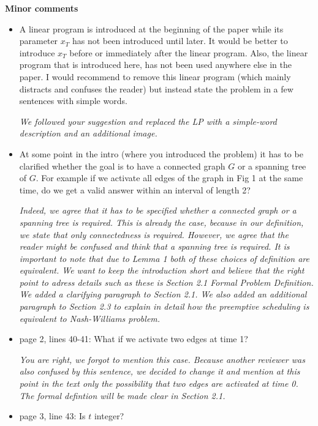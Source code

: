 \documentclass[11pt,a4paper]{article}
\begin{document}
\textbf{Minor comments}

\begin{itemize}

\item A linear program is introduced at the beginning of the paper while its parameter $x_T$ has not been introduced until later. It would be better to introduce $x_T$ before or immediately after the linear program. 
Also, the linear program that is introduced here, has not been used anywhere else in the paper. I would recommend to remove this linear program (which mainly distracts and confuses the reader) but instead state the problem in a few sentences with simple words.

\textit{We followed your suggestion and replaced the LP with a simple-word description and an additional image. }

\item At some point in the intro (where you introduced the problem) it has to be clarified whether the goal is to have a connected graph $G$ or a spanning tree of $G$. For example if we activate all edges of the graph in Fig 1 at the same time, do we get a valid answer within an interval of length 2? 

\textit{ Indeed, we agree that it has to be specified whether a connected graph or a spanning tree is required. This is already the case, because in our definition, we state that only connectedness is required.  However, we agree that the reader might be confused and think that a spanning tree is required. It is important to note that due to Lemma 1 both of these choices of definition are equivalent.  We want to keep the introduction short and believe that the right point to adress details such as these is Section 2.1 Formal Problem Definition. We added a clarifying paragraph to Section 2.1. We also added an additional paragraph to Section 2.3 to explain in detail how the \emph{preemptive} scheduling is equivalent to Nash-Williams problem.}

\item page 2, lines 40-41: What if we activate two edges at time 1?

\textit{You are right, we forgot to mention this case. Because another reviewer was also confused by this sentence, we decided to change it and mention at this point in the text only the possibility that two edges are activated at time 0. The formal defintion will be made clear in Section 2.1. }

\item page 3, line 43: Is $t$ integer?


\end{itemize}
\end{document}
